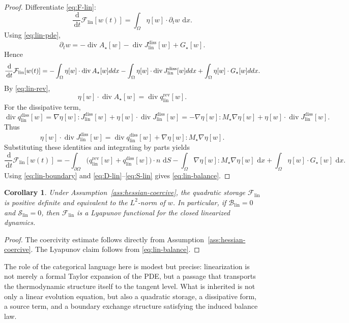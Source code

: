 \documentclass[11pt]{article}
\newtheorem{corollary}[theorem]{Corollary}
\newcommand{\Om}{\Omega}
\newcommand{\pa}{\partial}
\newcommand{\grad}{\nabla}
\newcommand{\diver}{\operatorname{div}}
\newcommand{\dd}{\,\mathrm{d}}
\newcommand{\F}{\mathcal{F}}
\newcommand{\Bnd}{\mathcal{B}}
\newcommand{\Src}{\mathcal{S}}
\newcommand{\lin}{\mathrm{lin}}
\begin{document}
\begin{proof}
Differentiate \eqref{eq:F-lin}:
\[
\frac{\dd}{\dd t}\F_{\lin}[w(t)]
=
\int_\Om \eta[w]\cdot \partial_t w\,\dd x.
\]
Using \eqref{eq:lin-pde},
\[
\partial_t w
=
-\diver A_\star[w]
-\diver J_{\lin}^{\mathrm{diss}}[w]
+G_\star[w].
\]
Hence
\[
\frac{\dd}{\dd t}\F_{\lin}[w(t)]
=
-\int_\Om \eta[w]\cdot \diver A_\star[w]\\ dd x
-\int_\Om \eta[w]\cdot \diver J_{\lin}^{\mathrm{diss}}[w]\\ dd x
+\int_\Om \eta[w]\cdot G_\star[w]\\ dd x.
\]
By \eqref{eq:lin-rev},
\[
\eta[w]\cdot \diver A_\star[w]=\diver q_{\lin}^{\mathrm{rev}}[w].
\]
For the dissipative term,
\[
\diver q_{\lin}^{\mathrm{diss}}[w]
=
\grad \eta[w]:J_{\lin}^{\mathrm{diss}}[w]
+
\eta[w]\cdot \diver J_{\lin}^{\mathrm{diss}}[w]
=
-\grad \eta[w]:M_\star \grad \eta[w]
+
\eta[w]\cdot \diver J_{\lin}^{\mathrm{diss}}[w].
\]
Thus
\[
\eta[w]\cdot \diver J_{\lin}^{\mathrm{diss}}[w]
=
\diver q_{\lin}^{\mathrm{diss}}[w]
+
\grad \eta[w]:M_\star \grad \eta[w].
\]
Substituting these identities and integrating by parts yields
\[
\frac{\dd}{\dd t}\F_{\lin}[w(t)]
=
-\int_{\pa\Om}\bigl(q_{\lin}^{\mathrm{rev}}[w]+q_{\lin}^{\mathrm{diss}}[w]\bigr)\cdot n\,\dd S
-\int_\Om \grad \eta[w]:M_\star \grad \eta[w]\,\dd x
+\int_\Om \eta[w]\cdot G_\star[w]\,\dd x.
\]
Using \eqref{eq:lin-boundary} and \eqref{eq:D-lin}--\eqref{eq:S-lin} gives
\eqref{eq:lin-balance}.
\end{proof}

\begin{corollary}
Under Assumption~\ref{ass:hessian-coercive}, the quadratic storage \(\F_{\lin}\) is
positive definite and equivalent to the \(L^2\)-norm of \(w\). In particular, if
\(\Bnd_{\lin}=0\) and \(\Src_{\lin}=0\), then \(\F_{\lin}\) is a Lyapunov functional
for the closed linearized dynamics.
\end{corollary}

\begin{proof}
The coercivity estimate follows directly from
Assumption~\ref{ass:hessian-coercive}. The Lyapunov claim follows from
\eqref{eq:lin-balance}.
\end{proof}

The role of the categorical language here is modest but precise: linearization is not
merely a formal Taylor expansion of the PDE, but a passage that transports the
thermodynamic structure itself to the tangent level. What is inherited is not only a
linear evolution equation, but also a quadratic storage, a dissipative form, a source
term, and a boundary exchange structure satisfying the induced balance law.
\end{document}
